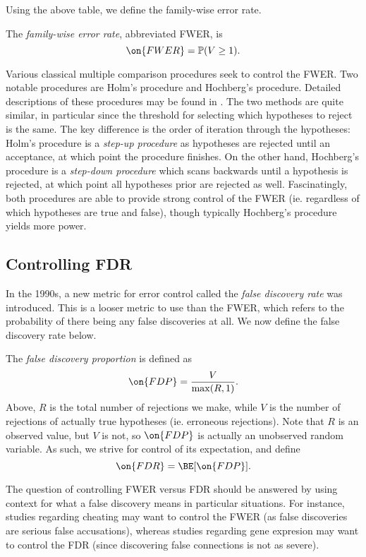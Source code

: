 \documentclass[12pt,reqno]{amsart}
\numberwithin{equation}{section}
\begin{document}
Using the above table, we define the family-wise error rate.
\begin{defn}
The \emph{family-wise error rate}, abbreviated FWER, is
\begin{equation}
\on{FWER} = \mathbb{P}(V \geq  1).
\end{equation}
\end{defn}
Various classical multiple comparison procedures seek to control the FWER. Two notable procedures are Holm's procedure and Hochberg's procedure. Detailed descriptions of these procedures may be found in \cite{stat300}. The two methods are quite similar, in particular since the threshold for selecting which hypotheses to reject is the same. The key difference is the order of iteration through the hypotheses: Holm's procedure is a \emph{step-up procedure} as hypotheses are rejected until an acceptance, at which point the procedure finishes. On the other hand, Hochberg's procedure is a \emph{step-down procedure} which scans backwards until a hypothesis is rejected, at which point all hypotheses prior are rejected as well. Fascinatingly, both procedures are able to provide strong control of the FWER (ie. regardless of which hypotheses are true and false), though typically Hochberg's procedure yields more power.

\subsection{Controlling FDR}
In the 1990s, a new metric for error control called the \emph{false discovery rate} was introduced. This is a looser metric to use than the FWER, which refers to the probability of there being any false discoveries at all. We now define the false discovery rate below.
\begin{defn}
The \emph{false discovery proportion} is defined as
\[ \on{FDP} = \frac{V}{\max(R, 1)}. \] Above, $R$ is the total number of rejections we make, while $V$ is the number of rejections of actually true hypotheses (ie. erroneous rejections). Note that $R$ is an observed value, but $V$ is not, so $\on{FDP}$ is actually an unobserved random variable. As such, we strive for control of its expectation, and define
\[ \on{FDR} = \BE[\on{FDP}]. \]
\end{defn}
The question of controlling FWER versus FDR should be answered by using context for what a false discovery means in particular situations. For instance, studies regarding cheating may want to control the FWER (as false discoveries are serious false accusations), whereas studies regarding gene expresion may want to control the FDR (since discovering false connections is not as severe). 
\end{document}
